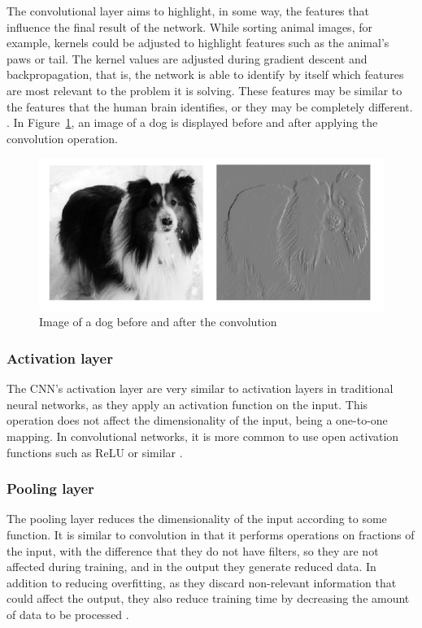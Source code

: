 \documentclass[a4paper,fleqn]{cas-sc}
\begin{document}
The convolutional layer aims to highlight, in some way, the features that influence the final result of the network. While sorting animal images, for example, kernels could be adjusted to highlight features such as the animal's paws or tail. The kernel values are adjusted during gradient descent and backpropagation, that is, the network is able to identify by itself which features are most relevant to the problem it is solving. These features may be similar to the features that the human brain identifies, or they may be completely different. \cite{aggarwal2018, heaton2015}. In Figure~\ref{fig:conv}, an image of a dog is displayed before and after applying the convolution operation.

\begin{figure}[h!]
	\caption{Image of a dog before and after the convolution}
	\label{fig:conv}
	\centering%
	\begin{minipage}{0.7\textwidth}
		\includegraphics[width=\textwidth]{images/conv_goodfellow.png}
	\end{minipage}
\end{figure}

\subsubsection{Activation layer}
The CNN's activation layer are very similar to activation layers in traditional neural networks, as they apply an activation function on the input. This operation does not affect the dimensionality of the input, being a one-to-one mapping. In convolutional networks, it is more common to use open activation functions such as ReLU or similar \cite{aggarwal2018}.

\subsubsection{Pooling layer}
The pooling layer reduces the dimensionality of the input according to some function. It is similar to convolution in that it performs operations on fractions of the input, with the difference that they do not have filters, so they are not affected during training, and in the output they generate reduced data. In addition to reducing overfitting, as they discard non-relevant information that could affect the output, they also reduce training time by decreasing the amount of data to be processed \cite{aggarwal2018}.
\end{document}
